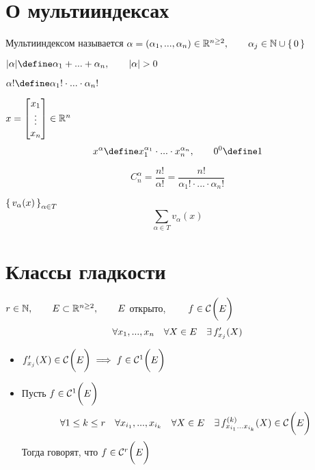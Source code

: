\section{О мультииндексах}

\begin{definition}
	Мультииндексом называется $ \alpha = (\alpha_1, ..., \alpha_n) \in \R^{n \ge 2}, \qquad \alpha _j \in \N \cup \set0 $
\end{definition}

\begin{definition}
	$ |\alpha| \define \alpha_1 + ... + \alpha_n, \qquad |\alpha| > 0 $
\end{definition}

\begin{notation}
	$ \alpha! \define \alpha_1! \cdot ... \cdot \alpha_n! $
\end{notation}

\begin{notation}
	$ x = \column{x_1}{x_n} \in \R^n $
	$$ x^\alpha \define x_1^{\alpha_1} \cdot ... \cdot x_n^{\alpha_n}, \qquad 0^0 \define 1 $$
\end{notation}

\begin{notation}
	$$ C_n^\alpha = \frac{n!}{\alpha!} = \frac{n!}{\alpha_1! \cdot ... \cdot \alpha_n!} $$
\end{notation}

\begin{notation}
	$ \set{v_\alpha(x)}_{\alpha \in T} $
	$$ \sum_{\alpha \in T} v_\alpha(x) $$
\end{notation}

\section{Классы гладкости}

\begin{definition}[$ \mathcal{C}^r(E) $]
	$ r \in \N, \qquad E \sub \R^{n \ge 2}, \qquad E $ открыто, $ \qquad f \in \Cont{E} $
	$$ \forall x_1, ..., x_n \quad \forall X \in E \quad \exist f_{x_j}'(X) $$
	\begin{itemize}
		\item $ f_{x_j}'(X) \in \Cont{E} \implies f \in \Cont[1]{E} $
		\item Пусть $ f \in \Cont[1]{E} $
		$$ \forall 1 \le k \le r \quad \forall x_{i_1}, ..., x_{i_k} \quad \forall X \in E \quad \exist f_{x_{i_1}...x_{i_k}}^{(k)}(X) \in \Cont{E} $$
		Тогда говорят, что $ f \in \Cont[r]{E} $
	\end{itemize}
\end{definition}

